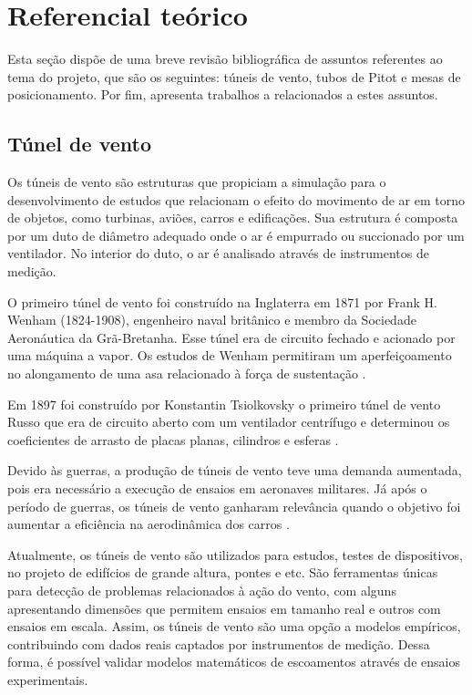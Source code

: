 \chapter{Referencial teórico}\label{ch:referencial}

Esta seção dispõe de uma breve revisão bibliográfica de assuntos referentes ao tema do projeto, que são 
os seguintes: túneis de vento, tubos de Pitot e mesas de posicionamento. Por fim, apresenta trabalhos a 
relacionados a estes assuntos.

\section{Túnel de vento}\label{sec:tunel}

Os túneis de vento são estruturas que propiciam a simulação para o desenvolvimento de estudos que relacionam 
o efeito do movimento de ar em torno de objetos, como turbinas, aviões, carros e edificações. Sua estrutura 
é composta por um duto de diâmetro adequado onde o ar é empurrado ou succionado por um ventilador. No 
interior do duto, o ar é analisado através de instrumentos de medição.

O primeiro túnel de vento foi construído na Inglaterra em 1871 por Frank H. Wenham (1824-1908), engenheiro 
naval britânico e membro da Sociedade Aeronáutica da Grã-Bretanha. Esse túnel era de circuito fechado e 
acionado por uma máquina a vapor. Os estudos de Wenham permitiram um aperfeiçoamento no alongamento de 
uma asa relacionado à força de sustentação \cite{carminatti2019desenvolvimento}.

Em 1897 foi construído por Konstantin Tsiolkovsky o primeiro túnel de vento Russo que era de circuito 
aberto com um ventilador centrífugo e determinou os coeficientes de arrasto de placas planas, cilindros 
e esferas \cite{joglekar2014design}. 

Devido às guerras, a produção de túneis de vento teve uma demanda aumentada, pois era necessário a execução 
de ensaios em aeronaves militares. Já após o período de guerras, os túneis de vento ganharam relevância 
quando o objetivo foi aumentar a eficiência na aerodinâmica dos carros \cite{de2014adalberto}. 

Atualmente, os túneis de vento são utilizados para estudos, testes de dispositivos, no projeto de edifícios de 
grande altura, pontes e etc. São ferramentas únicas para detecção de problemas relacionados à ação do vento, 
com alguns apresentando dimensões que permitem ensaios em tamanho real e outros com ensaios em escala. Assim, 
os túneis de vento são uma opção a modelos empíricos, contribuindo com dados reais captados por instrumentos 
de medição. Dessa forma, é possível validar modelos matemáticos de escoamentos através de ensaios experimentais.

